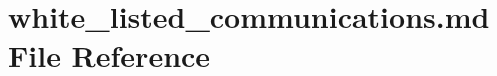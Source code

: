 \hypertarget{white__listed__communications_8md}{\section{white\-\_\-listed\-\_\-communications.\-md File Reference}
\label{white__listed__communications_8md}
}
